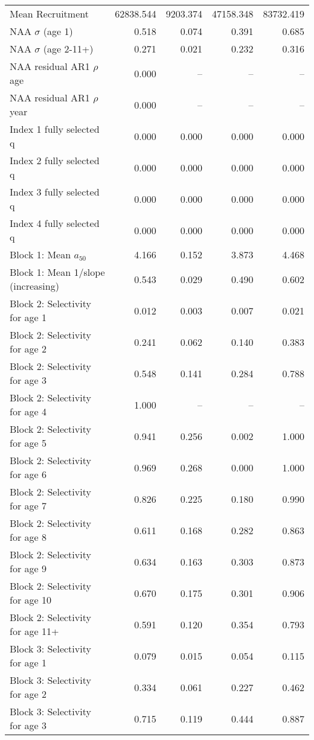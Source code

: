 \documentclass[
]{article}
\begin{document}
\begin{landscape}
\begin{longtable}[t]{lrrrr}
\endfoot
\bottomrule
\endlastfoot
Mean Recruitment & 62838.544 & 9203.374 & 47158.348 & 83732.419\\
NAA $\sigma$ (age 1) & 0.518 & 0.074 & 0.391 & 0.685\\
NAA $\sigma$ (age 2-11+) & 0.271 & 0.021 & 0.232 & 0.316\\
NAA residual AR1 $\rho$ age & 0.000 & -- & -- & --\\
NAA residual AR1 $\rho$ year & 0.000 & -- & -- & --\\
\addlinespace
Index 1 fully selected q & 0.000 & 0.000 & 0.000 & 0.000\\
Index 2 fully selected q & 0.000 & 0.000 & 0.000 & 0.000\\
Index 3 fully selected q & 0.000 & 0.000 & 0.000 & 0.000\\
Index 4 fully selected q & 0.000 & 0.000 & 0.000 & 0.000\\
Block 1: Mean $a_{50}$ & 4.166 & 0.152 & 3.873 & 4.468\\
\addlinespace
Block 1: Mean 1/slope (increasing) & 0.543 & 0.029 & 0.490 & 0.602\\
Block 2: Selectivity for age 1 & 0.012 & 0.003 & 0.007 & 0.021\\
Block 2: Selectivity for age 2 & 0.241 & 0.062 & 0.140 & 0.383\\
Block 2: Selectivity for age 3 & 0.548 & 0.141 & 0.284 & 0.788\\
Block 2: Selectivity for age 4 & 1.000 & -- & -- & --\\
\addlinespace
Block 2: Selectivity for age 5 & 0.941 & 0.256 & 0.002 & 1.000\\
Block 2: Selectivity for age 6 & 0.969 & 0.268 & 0.000 & 1.000\\
Block 2: Selectivity for age 7 & 0.826 & 0.225 & 0.180 & 0.990\\
Block 2: Selectivity for age 8 & 0.611 & 0.168 & 0.282 & 0.863\\
Block 2: Selectivity for age 9 & 0.634 & 0.163 & 0.303 & 0.873\\
\addlinespace
Block 2: Selectivity for age 10 & 0.670 & 0.175 & 0.301 & 0.906\\
Block 2: Selectivity for age 11+ & 0.591 & 0.120 & 0.354 & 0.793\\
Block 3: Selectivity for age 1 & 0.079 & 0.015 & 0.054 & 0.115\\
Block 3: Selectivity for age 2 & 0.334 & 0.061 & 0.227 & 0.462\\
Block 3: Selectivity for age 3 & 0.715 & 0.119 & 0.444 & 0.887\\

\end{longtable}
\end{landscape}
\end{document}
